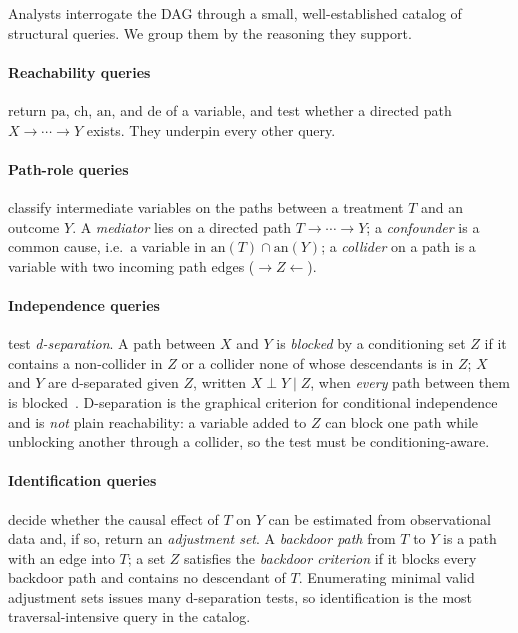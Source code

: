 Analysts interrogate the DAG through a small, well-established
catalog of structural queries. We group them by the reasoning they support.

\paragraph{Reachability queries} return $\mathrm{pa}$, $\mathrm{ch}$,
$\mathrm{an}$, and $\mathrm{de}$ of a variable, and test whether a directed path
$X\rightarrow\!\cdots\!\rightarrow Y$ exists. They underpin every other query.

\paragraph{Path-role queries} classify intermediate variables on the paths
between a treatment $T$ and an outcome $Y$. A \emph{mediator} lies on a directed
path $T\rightarrow\!\cdots\!\rightarrow Y$; a \emph{confounder} is a common cause,
i.e.\ a variable in $\mathrm{an}(T)\cap\mathrm{an}(Y)$; a \emph{collider} on a
path is a variable with two incoming path edges ($\rightarrow Z \leftarrow$).

\paragraph{Independence queries} test \emph{d-separation}. A path between $X$ and
$Y$ is \emph{blocked} by a conditioning set $Z$ if it contains a non-collider in
$Z$ or a collider none of whose descendants is in $Z$; $X$ and $Y$ are
d-separated given $Z$, written $X \!\perp\! Y \mid Z$, when \emph{every} path
between them is blocked~\cite{pearl2009causality}. D-separation is the graphical
criterion for conditional independence and is \emph{not} plain reachability: a
variable added to $Z$ can block one path while unblocking another through a
collider, so the test must be conditioning-aware.

\paragraph{Identification queries} decide whether the causal effect of $T$ on $Y$
can be estimated from observational data and, if so, return an \emph{adjustment
set}. A \emph{backdoor path} from $T$ to $Y$ is a path with an edge into $T$; a
set $Z$ satisfies the \emph{backdoor criterion} if it blocks every backdoor path
and contains no descendant of $T$. Enumerating minimal valid adjustment sets
issues many d-separation tests, so identification is the most traversal-intensive
query in the catalog.

